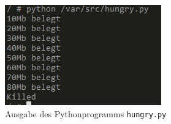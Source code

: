 \begin{figure}[hp]
	 \begin{center}
	 	\includegraphics[scale=1.3]{bilder/cgroup-container-killed.png}
	 	\caption{Ausgabe des Pythonprogramms \texttt{hungry.py}}
	 	\label{fig:cgroupKilled}
	 \end{center}
\end{figure}